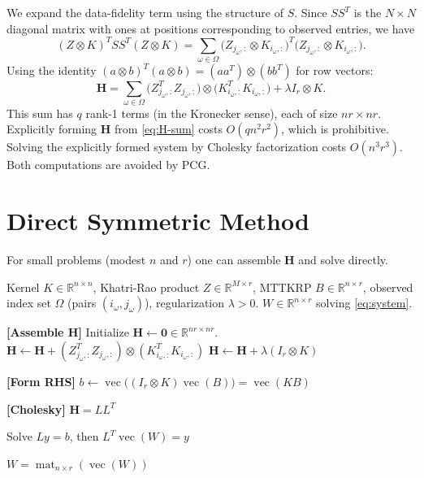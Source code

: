 \documentclass[12pt]{article}
\theoremstyle{definition}
\DeclareMathOperator{\vecop}{vec}
\DeclareMathOperator{\mat}{mat}
\begin{document}
We expand the data-fidelity term using the structure of $S$.  Since $SS^T$ is the $N \times N$
diagonal matrix with ones at positions corresponding to observed entries, we have
\[
  (Z \otimes K)^T SS^T (Z \otimes K)
  = \sum_{\omega \in \Omega}
    \bigl(Z_{j_\omega,:} \otimes K_{i_\omega,:}\bigr)^T
    \bigl(Z_{j_\omega,:} \otimes K_{i_\omega,:}\bigr).
\]
Using the identity $(a \otimes b)^T(a \otimes b) = (aa^T) \otimes (bb^T)$ for row vectors:
\begin{equation}
  \mathbf{H}
  = \sum_{\omega \in \Omega}
    \bigl(Z_{j_\omega,:}^T Z_{j_\omega,:}\bigr) \otimes
    \bigl(K_{i_\omega,:}^T K_{i_\omega,:}\bigr)
    + \lambda I_r \otimes K.
  \label{eq:H-sum}
\end{equation}
This sum has $q$ rank-1 terms (in the Kronecker sense), each of size $nr \times nr$.
Explicitly forming $\mathbf{H}$ from \eqref{eq:H-sum} costs $O(q n^2 r^2)$, which is
prohibitive.  Solving the explicitly formed system by Cholesky factorization costs $O(n^3 r^3)$.
Both computations are avoided by PCG.

\section{Direct Symmetric Method}

For small problems (modest $n$ and $r$) one can assemble $\mathbf{H}$ and solve directly.

\begin{algorithm}
\caption{Direct Symmetric Solver for the RKHS-CP Mode-$k$ Subproblem}
\label{alg:direct}
\begin{algorithmic}[1]
  \Require Kernel $K \in \mathbb{R}^{n \times n}$,
           Khatri-Rao product $Z \in \mathbb{R}^{M \times r}$,
           MTTKRP $B \in \mathbb{R}^{n \times r}$,
           observed index set $\Omega$ (pairs $(i_\omega,j_\omega)$),
           regularization $\lambda > 0$.
  \Ensure  $W \in \mathbb{R}^{n \times r}$ solving \eqref{eq:system}.

  \State \textbf{[Assemble $\mathbf{H}$]} Initialize $\mathbf{H} \leftarrow \mathbf{0} \in \mathbb{R}^{nr \times nr}$.
    \State $\mathbf{H} \leftarrow \mathbf{H}
              + (Z_{j_\omega,:}^T Z_{j_\omega,:}) \otimes (K_{i_\omega,:}^T K_{i_\omega,:})$
  \EndFor
  \State $\mathbf{H} \leftarrow \mathbf{H} + \lambda (I_r \otimes K)$

  \State \textbf{[Form RHS]} $b \leftarrow \vecop\!\bigl((I_r \otimes K)\vecop(B)\bigr)
                                         = \vecop(KB)$

  \State \textbf{[Cholesky]} $\mathbf{H} = LL^T$

  \State Solve $L y = b$, then $L^T \vecop(W) = y$

  \State \Return $W = \mat_{n \times r}(\vecop(W))$
\end{algorithmic}
\end{algorithm}
\end{document}
